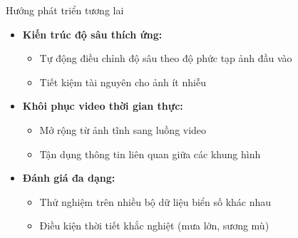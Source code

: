 
\begin{frame}{Hướng phát triển tương lai}
    \small
    \begin{itemize}

        \item \textbf{Kiến trúc độ sâu thích ứng:}
        \begin{itemize}
            \item Tự động điều chỉnh độ sâu theo độ phức tạp ảnh đầu vào
            \item Tiết kiệm tài nguyên cho ảnh ít nhiễu
        \end{itemize}
        \item \textbf{Khôi phục video thời gian thực:}
        \begin{itemize}
            \item Mở rộng từ ảnh tĩnh sang luồng video
            \item Tận dụng thông tin liên quan giữa các khung hình
        \end{itemize}
        \item \textbf{Đánh giá đa dạng:}
        \begin{itemize}
            \item Thử nghiệm trên nhiều bộ dữ liệu biển số khác nhau
            \item Điều kiện thời tiết khắc nghiệt (mưa lớn, sương mù)
        \end{itemize}
    \end{itemize}
\end{frame}

